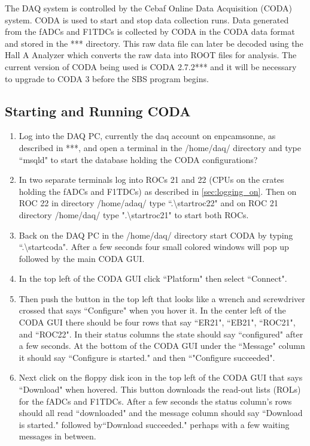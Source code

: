 \documentclass[oneside]{book}   %
\begin{document}
The DAQ system is controlled by the Cebaf Online Data Acquisition (CODA) system. CODA is used to start and stop data collection runs. Data generated from the fADCs and F1TDCs is collected by CODA in the CODA data format and stored in the *** directory. This raw data file can later be decoded using the Hall A Analyzer which converts the raw data into ROOT files for analysis. The current version of CODA being used is CODA 2.7.2*** and it will be necessary to upgrade to CODA 3 before the SBS program begins.

\subsection{Starting and Running CODA}
\label{ssec:running_coda}

\begin{enumerate}
	\item Log into the DAQ PC, currently the daq account on enpcamsonne, as described in ***, and open a terminal in the /home/daq/ directory and type ``msqld" to start the database holding the CODA configurations? 
	\item In two separate terminals log into ROCs 21 and 22 (CPUs on the crates holding the fADCs and F1TDCs) as described in \cref{sec:logging_on}. Then on ROC 22 in directory /home/adaq/ type ``.\textbackslash startroc22" and on ROC 21 directory /home/daq/ type ".\textbackslash startroc21" to start both ROCs. %
	\item Back on the DAQ PC in the /home/daq/ directory start CODA by typing ``.\textbackslash startcoda". After a few seconds four small colored windows will pop up followed by the main CODA GUI.
	\item In the top left of the CODA GUI click ``Platform" then select ``Connect". 
	\item Then push the button in the top left that looks like a wrench and screwdriver crossed that says ``Configure" when you hover it. In the center left of the CODA GUI there should be four rows that say ``ER21", ``EB21", ``ROC21", and ``ROC22". In their status columns the state should say ``configured" after a few seconds. At the bottom of the CODA GUI under the ``Message" column it should say ``Configure is started." and then ``"Configure succeeded". 
	\item Next click on the floppy disk icon in the top left of the CODA GUI that says ``Download" when hovered. This button downloads the read-out lists (ROLs) for the fADCs and F1TDCs. After a few seconds the status column's rows should all read ``downloaded" and the message column should say ``Download is started." followed by``Download succeeded." perhaps with a few waiting messages in between.

\end{enumerate}
\end{document}
